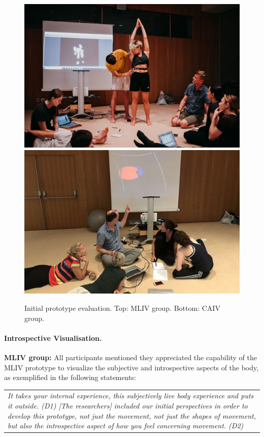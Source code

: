 \begin{figure}[ht]
  \centering
\hspace{8em}
\includegraphics[width=0.7\linewidth]{Chapters/Figures/modi_dis/ml-test-s.jpg}
\hspace{-12em}
\includegraphics[width=0.7\linewidth]{Chapters/Figures/modi_dis/hitl-test-s.jpeg}
\caption{Initial prototype evaluation. Top: MLIV group. Bottom: CAIV group.}
\label{fig:tests}
\end{figure}


\paragraph{Introspective Visualisation.}

\textbf{MLIV group:} All participants mentioned they appreciated the capability of the MLIV prototype to visualize the subjective and introspective aspects of the body, as exemplified in the following statements:

\begin{center}
\begin{tabular}{ p{13cm}}
\textit{It takes your internal experience, this subjectively live body experience and puts it outside. (D1)
[The researchers] included our initial perspectives in order to develop this prototype, not just the movement, not just the shapes of movement, but also the introspective aspect of how you feel concerning movement. (D2)}
\end{tabular}
\end{center}

